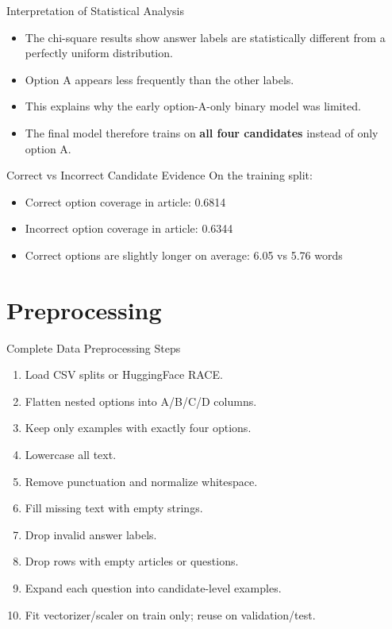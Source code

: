 \documentclass[aspectratio=169,11pt]{beamer}
\begin{document}
\begin{frame}{Interpretation of Statistical Analysis}
    \begin{itemize}
        \item The chi-square results show answer labels are statistically different from a perfectly uniform distribution.
        \item Option A appears less frequently than the other labels.
        \item This explains why the early option-A-only binary model was limited.
        \item The final model therefore trains on \textbf{all four candidates} instead of only option A.
    \end{itemize}

    \begin{block}{Correct vs Incorrect Candidate Evidence}
        On the training split:
        \begin{itemize}
            \item Correct option coverage in article: 0.6814
            \item Incorrect option coverage in article: 0.6344
            \item Correct options are slightly longer on average: 6.05 vs 5.76 words
        \end{itemize}
    \end{block}
\end{frame}

\section{Preprocessing}

\begin{frame}{Complete Data Preprocessing Steps}
    \begin{enumerate}
        \item Load CSV splits or HuggingFace RACE.
        \item Flatten nested options into A/B/C/D columns.
        \item Keep only examples with exactly four options.
        \item Lowercase all text.
        \item Remove punctuation and normalize whitespace.
        \item Fill missing text with empty strings.
        \item Drop invalid answer labels.
        \item Drop rows with empty articles or questions.
        \item Expand each question into candidate-level examples.
        \item Fit vectorizer/scaler on train only; reuse on validation/test.
    \end{enumerate}
\end{frame}
\end{document}
